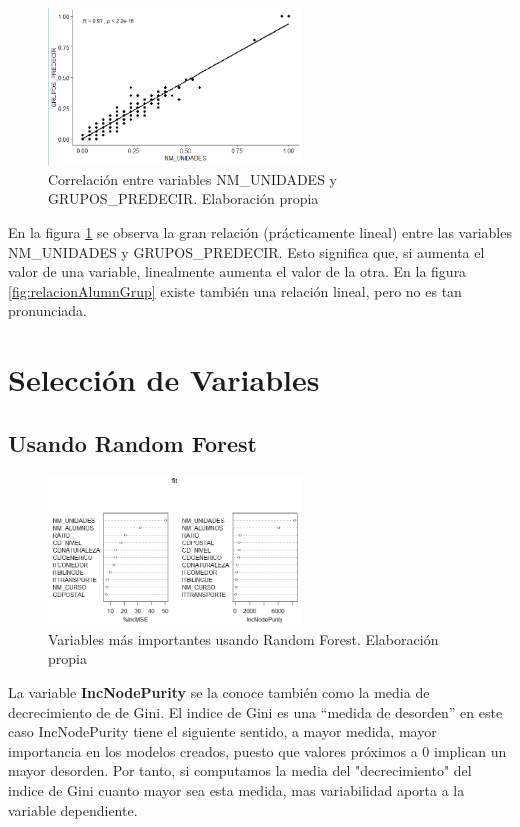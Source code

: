 \begin{subappendices}
\begin{figure}[htb]
\end{figure}
\FloatBarrier

\begin{figure}[htb]
	\centering
	\caption{Correlación entre variables NM\_UNIDADES y GRUPOS\_PREDECIR. Elaboración propia}
	\label{fig:RelacionGruposYUnidades}
	\includegraphics[width=0.6\textwidth]{recursos/ImagenesR/RelacionGruposYUnidades}
	
\end{figure}
\FloatBarrier

En la figura \ref{fig:RelacionGruposYUnidades} se observa la gran relación (prácticamente lineal) entre las variables NM\_UNIDADES y GRUPOS\_PREDECIR. Esto significa que, si aumenta el valor de una variable, linealmente aumenta el valor de la otra. En la figura \ref{fig:relacionAlumnGrup} existe también una relación lineal, pero no es tan pronunciada.

\section{Selección de Variables}
\subsection{Usando Random Forest}
\begin{figure}[htb]
	\centering
	\caption{Variables más importantes usando Random Forest. Elaboración propia}
	\label{fig:VarImpRF}
	\includegraphics[width=0.6\textwidth]{recursos/ImagenesR/VarImpRF}
	
\end{figure}
\FloatBarrier
La variable \textbf{IncNodePurity} se la conoce también como la media de decrecimiento de de Gini. El indice de Gini es una ``medida de desorden'' en este caso IncNodePurity tiene el siguiente sentido, a mayor medida, mayor importancia en los modelos creados, puesto que valores próximos a 0 implican un mayor desorden. Por tanto, si computamos la media del "decrecimiento" del indice de Gini cuanto mayor sea esta medida, mas variabilidad aporta a la variable dependiente.


\end{subappendices}
